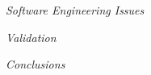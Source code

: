 \documentclass[a4paper,11pt,titlepage]{article}
\begin{document}
\begin{description}
	\item \emph{Software Engineering Issues}

	\item \emph{Validation}

	\item \emph{Conclusions}

\end{description}
\end{document}
